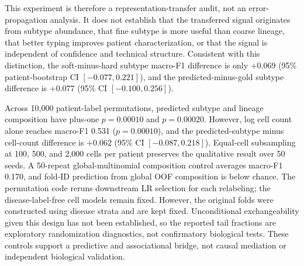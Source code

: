 \documentclass{article} %
\begin{document}
This experiment is therefore a representation-transfer audit, not an error-
propagation analysis. It does not establish that the transferred signal
originates from subtype abundance, that fine subtype is more useful than coarse
lineage, that better typing improves patient characterization, or that the
signal is independent of confidence and technical structure. Consistent with
this distinction, the soft-minus-hard subtype macro-F1 difference is only
$+0.069$ (95\% patient-bootstrap CI $[-0.077,0.221]$), and the
predicted-minus-gold subtype difference is $+0.077$ (95\% CI
$[-0.100,0.256]$).

Across 10{,}000 patient-label permutations, predicted subtype and
lineage composition have plus-one $p=0.00010$ and $p=0.00020$. However, log cell
count alone reaches macro-F1 0.531 ($p=0.00010$), and the predicted-subtype minus
cell-count difference is $+0.062$ (95\% CI $[-0.087,0.218]$). Equal-cell
subsampling at 100, 500, and 2{,}000 cells per patient preserves the qualitative
result over 50 seeds. A 50-repeat global-multinomial composition control averages
macro-F1 0.170, and fold-ID prediction from global OOF composition is below
chance. The permutation code reruns downstream LR selection for each relabeling;
the disease-label-free cell models remain fixed. However, the original folds
were constructed using disease strata and are kept fixed. Unconditional
exchangeability given this design has not been established, so the reported
tail fractions are exploratory randomization diagnostics, not confirmatory
biological tests. These controls support a predictive and associational bridge, not causal
mediation or independent biological validation.
\end{document}
